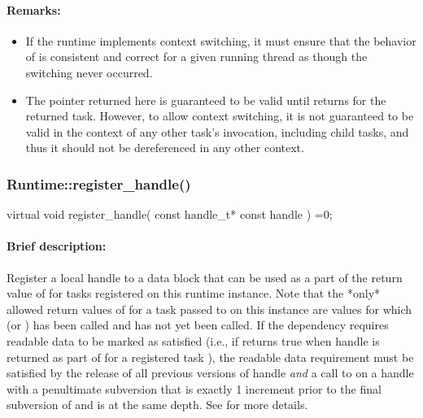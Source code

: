 \paragraph{Remarks:}
\begin{itemize}
\item If the runtime implements context switching, it must ensure that
     the behavior of  is consistent and correct for a given
     running thread as though the switching never occurred.
\item The pointer returned here is guaranteed to be valid until  returns for
     the returned task.  However, to allow context switching, it is not guaranteed to be valid
     in the context of any other task's  invocation, including child tasks, and thus it should
     not be dereferenced in any other context.
\end{itemize}

\subsubsection{Runtime::register\_handle()}
\begin{CppCode}
virtual void register_handle(
      const handle_t* const handle
    ) =0;
\end{CppCode}

\paragraph{Brief description:} Register a local handle to a data block
       that can be used as a part of the return value of  for tasks
       registered on this runtime instance.  Note that the *only* allowed return values of 
       for a task passed to  on this instance are values for which  (or
       ) has been called and  has not yet been called.  If the
       dependency requires readable data to be marked as satisfied (i.e., if 
       returns true when handle is returned as part of  for a registered task ),
       the readable data requirement must be satisfied by the release of all previous versions of handle
       \emph{and} a call to  on a handle with a penultimate subversion that is
       exactly 1 increment prior to the final subversion of  and is at the same depth.  See
        for more details.
     
